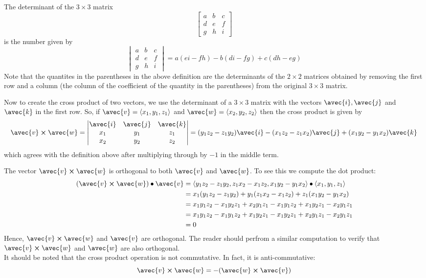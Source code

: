 \documentclass[handout]{ximera}
\begin{document}
\begin{definition}
The determinant of the $3 \times 3$ matrix 
\[
\begin{bmatrix}
a & b & c\\
d & e & f\\
g & h & i
\end{bmatrix}
\]
is the number given by
\[
\begin{vmatrix}
a & b & c\\
d & e & f\\
g & h & i
\end{vmatrix}
= a(ei-fh) - b(di-fg) + c(dh-eg)
\]
Note that the quantites in the parentheses in the above definition are the determinants of the $2 \times 2$ matrices
obtained by removing the first row and a column (the column of the coefficient of the quantity in the parentheses) from the original $3 \times 3$ matrix.
\end{definition}
 Now to create the cross product of two vectors, we use the determinant of a $3 \times 3$ matrix with the vectors $\avec{i}, \avec{j}$ and $\avec{k}$ in the first row.
 So, if $\avec{v} = \vector{x_1, y_1, z_1}$ and $\avec{w} = \vector{x_2, y_2, z_2}$ then the cross product is given by
 \[
\avec{v} \cross \avec{w} = 
 \begin{vmatrix}
\avec{i} & \avec{j} & \avec{k}\\
x_1 & y_1 & z_1\\
x_2 & y_2 & z_2
\end{vmatrix} = (y_1z_2 - z_1y_2)\avec{i} - (x_1z_2 - z_1x_2)\avec{j} + (x_1y_2-y_1x_2)\avec{k}
\]
which agrees with the definition above after multiplying through by $-1$ in the middle term.

The vector $\avec{v}\cross \avec{w}$ is orthogonal to both $\avec{v}$ and $\avec{w}$. To see this we compute the dot product:
\begin{align*}
\left(\avec{v} \cross \avec{w} \right) \dotp \avec{v} &= \vector{y_1z_2 - z_1y_2, z_1x_2 - x_1z_2, x_1y_2 - y_1x_2} \dotp \vector{x_1, y_1, z_1}\\
                                                &= x_1(y_1z_2 - z_1y_2) + y_1(z_1x_2 - x_1z_2) + z_1(x_1y_2 - y_1x_2)\\
                                                &= x_1y_1z_2 - x_1y_2z_1 + x_2y_1z_1 - x_1y_1z_2 + x_1y_2z_1 - x_2y_1z_1\\
                                                &= x_1y_1z_2 - x_1y_1z_2 + x_1y_2z_1 - x_1y_2z_1 + x_2y_1z_1 - x_2y_1z_1\\
                                                &= 0
\end{align*}
Hence, $\avec{v} \cross \avec{w}$ and $\avec{v}$ are orthogonal.  The reader should perfrom a similar computation to verify that
$\avec{v} \cross \avec{w}$ and $\avec{w}$ are also orthogonal.\\

It should be noted that the cross product operation is not commutative.  In fact, it is anti-commutative:
\[
\avec{v} \cross \avec{w} = -(\avec{w} \cross \avec{v})
\]
\end{document}
